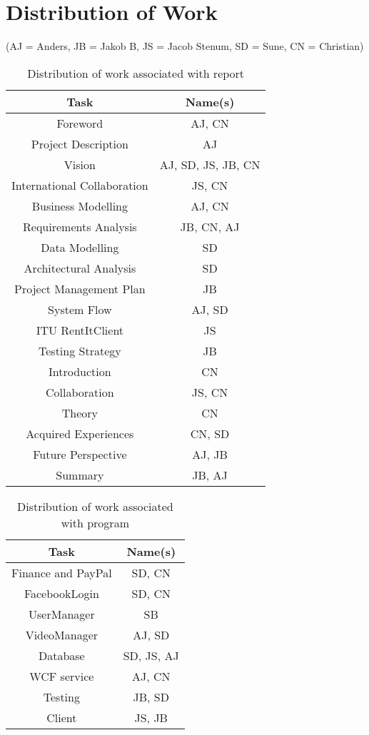 \section{Distribution of Work}
\label{Distribution of Work}
(AJ = Anders, JB = Jakob B, JS = Jacob Stenum, SD = Sune, CN = Christian)\\
\begin{table}[H]
\caption{Distribution of work associated with report}
\centering

\begin{tabular}{c c}
Task & Name(s) \\ [1.5ex] 
\hline
Foreword & AJ, CN \\
Project Description & AJ \\
Vision & AJ, SD, JS, JB, CN\\
International Collaboration & JS, CN \\
Business Modelling & AJ, CN \\
Requirements Analysis & JB, CN, AJ\\
Data Modelling & SD \\
Architectural Analysis & SD \\
Project Management Plan & JB \\
System Flow & AJ, SD\\
ITU RentItClient & JS \\ 
Testing Strategy & JB\\
Introduction & CN\\
Collaboration & JS, CN \\
Theory & CN \\
Acquired Experiences & CN, SD\\
Future Perspective & AJ, JB \\
Summary & JB, AJ \\

\end{tabular}
\end{table}

\begin{table}[H]
\caption{Distribution of work associated with program}
\centering
\begin{tabular}{c c}
Task & Name(s)\\ [1.5ex] 
\hline
Finance and PayPal & SD, CN \\
FacebookLogin & SD, CN \\
UserManager & SB \\
VideoManager & AJ, SD \\
Database & SD, JS, AJ \\
WCF service & AJ, CN\\
Testing & JB, SD \\
Client & JS, JB\\


\end{tabular}
\end{table}

